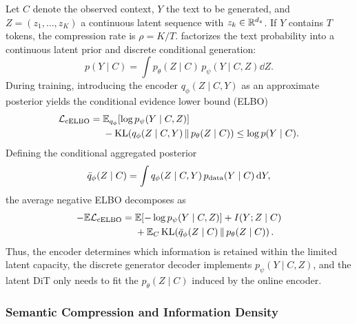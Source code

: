 Let $C$ denote the observed context, $Y$ the text to be generated, and $Z=(z_1,\ldots,z_K)$ a continuous latent sequence with $z_k\in\mathbb{R}^{d_z}$. If $Y$ contains $T$ tokens, the compression rate is $\rho=K/T$. \method factorizes the text probability into a continuous latent prior and discrete conditional generation:
\begin{equation}
    p(Y\mid C)
    =
    \int p_\theta(Z\mid C)\,
    p_\psi(Y\mid C,Z)\dd Z.
    \label{eq:main-prob}
\end{equation}
During training, introducing the encoder $q_\phi(Z\mid C,Y)$ as an approximate posterior yields the conditional evidence lower bound (ELBO)
\begin{equation}
\begin{aligned}
    \mathcal{L}_{\mathrm{cELBO}}
    ={}&
    \mathbb{E}_{q_\phi} [\log p_\psi(Y\mid C,Z)]\\
    &-\operatorname{KL}\!\left(q_\phi(Z\mid C,Y)\,\|\,p_\theta(Z\mid C)\right)
    \le \log p(Y\mid C).
\end{aligned}
\label{eq:main-celbo}
\end{equation}
Defining the conditional aggregated posterior
\begin{equation}
    \bar q_\phi(Z\mid C)
    =
    \int q_\phi(Z\mid C,Y)\,p_{\mathrm{data}}(Y\mid C)\,\mathrm{d} Y,
    \label{eq:main-agg}
\end{equation}
the average negative ELBO decomposes as
\begin{equation}
\begin{aligned}
    -\mathbb{E}\mathcal{L}_{\mathrm{cELBO}}
    ={}&
    \mathbb{E}[-\log p_\psi(Y\mid C,Z)]
    +I(Y;Z\mid C)\\
    &+\mathbb{E}_C\operatorname{KL}\!\left(\bar q_\phi(Z\mid C)\,\|\,p_\theta(Z\mid C)\right).
\end{aligned}
\label{eq:main-elbo-decomp}
\end{equation}
Thus, the encoder determines which information is retained within the limited latent capacity, the discrete generator decoder implements $p_\psi(Y\mid C,Z)$, and the latent DiT only needs to fit the $p_\theta(Z\mid C)$ induced by the online encoder.

\subsubsection{Semantic Compression and Information Density}

